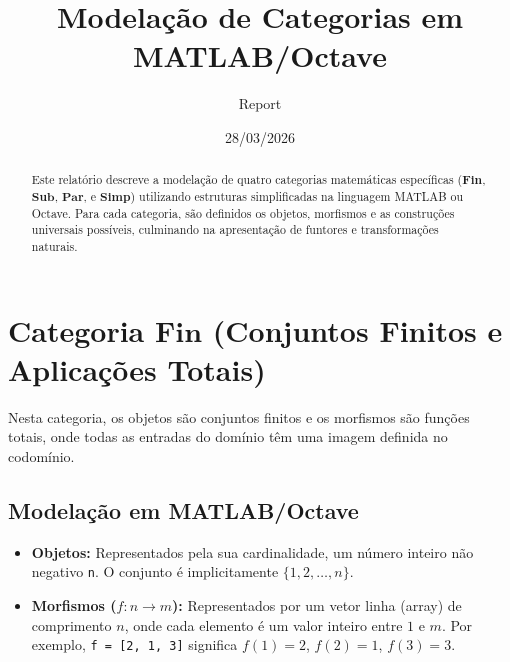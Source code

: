 \documentclass[11pt,a4paper]{article}
\title{\textbf{Modelação de Categorias em MATLAB/Octave}}
\author{Report}
\date{28/03/2026}
\begin{document}
\maketitle

\begin{abstract}
Este relatório descreve a modelação de quatro categorias matemáticas específicas ($\mathbf{Fin}$, $\mathbf{Sub}$, $\mathbf{Par}$, e $\mathbf{Simp}$) utilizando estruturas simplificadas na linguagem MATLAB ou Octave. Para cada categoria, são definidos os objetos, morfismos e as construções universais possíveis, culminando na apresentação de funtores e transformações naturais.
\end{abstract}

\tableofcontents
\newpage

\section{Categoria $\mathbf{Fin}$ (Conjuntos Finitos e Aplicações Totais)}

Nesta categoria, os objetos são conjuntos finitos e os morfismos são funções totais, onde todas as entradas do domínio têm uma imagem definida no codomínio.

\subsection{Modelação em MATLAB/Octave}
\begin{itemize}
    \item \textbf{Objetos:} Representados pela sua cardinalidade, um número inteiro não negativo \texttt{n}. O conjunto é implicitamente $\{1, 2, \dots, n\}$.
    \item \textbf{Morfismos ($f: n \to m$):} Representados por um vetor linha (array) de comprimento $n$, onde cada elemento é um valor inteiro entre $1$ e $m$. Por exemplo, \texttt{f = [2, 1, 3]} significa $f(1)=2$, $f(2)=1$, $f(3)=3$.
\end{itemize}
\end{document}
